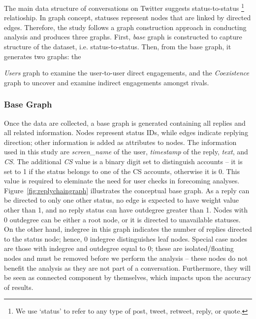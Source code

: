 \documentclass[sigconf]{acmart}
\begin{document}
The main data structure of conversations on Twitter suggests
status-to-status {\footnote{We use `status' to refer to any type of post, tweet,
retweet, reply, or quote.}} relatioship. In graph concept, statuses
represent nodes that are linked by directed edges. Therefore, the
study follows a graph construction approach in conducting analysis and
produces three graphs. First, {\emph{base}} graph is constructed to
capture structure of the dataset, i.e. status-to-status.  Then, from
the base graph, it generates two graphs: the {\emph{Users} graph to
examine the user-to-user direct engagements, and the {\emph{Coexistence}}
graph to uncover and examine indirect engagements amongst rivals.

\subsubsection{Base Graph}

Once the data are collected, a base graph is generated containing all
replies and all related information. Nodes represent status IDs, while
edges indicate replying direction; other information is added as
attributes to nodes. The information used in this study are
{\emph{screen\_name}} of the user, {\emph{timestamp}} of the reply,
{\emph{text}}, and {\emph{CS}}. The additional {\emph{CS}} value is a
binary digit set to distinguish accounts -- it is set to 1 if the status
belongs to one of the CS accounts, otherwise it is 0. This value is
required to eleminate the need for user checks in forecoming
analyses. Figure~\ref{fig:replychaingraph} illustrates the conceptual base
graph. As a reply can be directed to only one other status, no edge is
expected to have weight value other than 1, and no reply status can
have outdegree greater than 1. Nodes with 0 outdegree can be either a
root node, or it is directed to unavailable statuses. On the other
hand, indegree in this graph indicates the number of replies directed to
the status node; hence, 0 indegree distinguishes leaf nodes. Special case
nodes are those with indegree and outdegree equal to 0; these are
isolated/floating nodes and must be removed before we perform the
analysis -- these nodes do not benefit the analysis as they are not
part of a conversation. Furthermore, they will be seen as connected
component by themselves, which impacts upon the accuracy of results.

}
\end{document}

